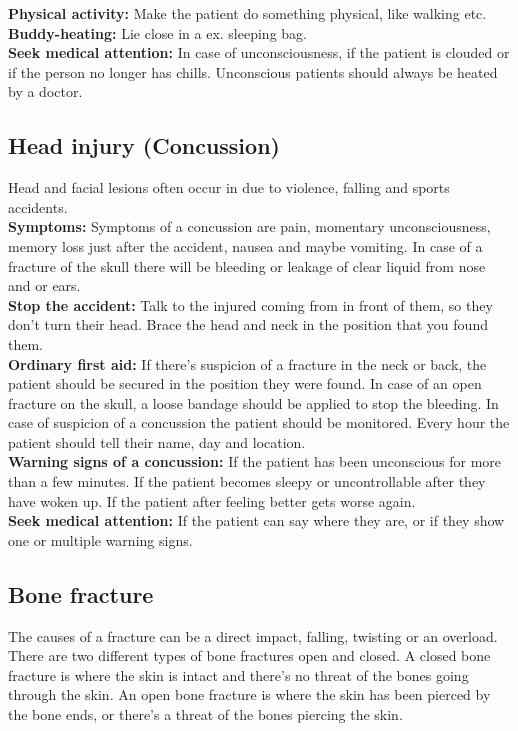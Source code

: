 \documentclass[../../../main.tex]{subfiles}
\begin{document}
\begin{multicols}{2}
\textbf{Physical activity:} Make the patient do something physical, like walking etc.
\\

\textbf{Buddy-heating:} Lie close in a ex. sleeping bag.
\\

\textbf{Seek medical attention:} In case of unconsciousness, if the patient is clouded or if the person no longer has chills. Unconscious patients should always be heated by a doctor.
\\
\subsection*{Head injury (Concussion)} Head and facial lesions often occur in due to violence, falling and sports accidents.
\\

\textbf{Symptoms:} Symptoms of a concussion are pain, momentary unconsciousness, memory loss just after the accident, nausea and maybe vomiting. In case of a fracture of the skull there will be bleeding or leakage of clear liquid from nose and or ears.
\\

\textbf{Stop the accident:} Talk to the injured coming from in front of them, so they don't turn their head. Brace the head and neck in the position that you found them.
\\

\textbf{Ordinary first aid:} If there's suspicion of a fracture in the neck or back, the patient should be secured in the position they were found. In case of an open fracture on the skull, a loose bandage should be applied to stop the bleeding. In case of suspicion of a concussion the patient should be monitored. Every hour the patient should tell their name, day and location.
\\

\textbf{Warning signs of a concussion:} If the patient has been unconscious for more than a few minutes. If the patient becomes sleepy or uncontrollable after they have woken up. If the patient after feeling better gets worse again. 
\\

\textbf{Seek medical attention:} If the patient can say where they are, or if they show one or multiple warning signs.
\\
\subsection*{Bone fracture} The causes of a fracture can be a direct impact, falling, twisting or an overload. There are two different types of bone fractures open and closed. A closed bone fracture is where the skin is intact and there's no threat of the bones going through the skin. An open bone fracture is where the skin has been pierced by the bone ends, or there's a threat of the bones piercing the skin.
\\


\end{multicols}
\end{document}
